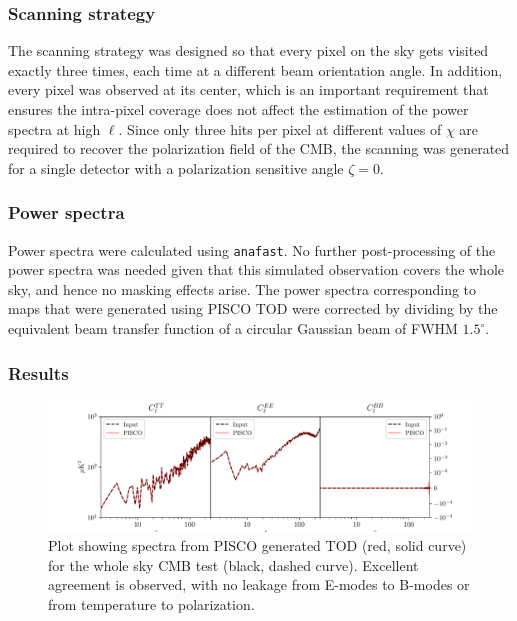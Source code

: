 \documentclass[a4paper,11pt]{article}
\begin{document}
\subsubsection{Scanning strategy}

The scanning strategy was designed so that every pixel on the sky gets visited exactly three times, each time at a different beam orientation angle. In addition, every pixel was observed at its center, which is an important requirement that ensures the intra-pixel coverage does not affect the estimation of the power spectra at high $\ell$. Since only three hits per pixel at different values of $\chi$ are required to recover the polarization field of the CMB, the scanning was generated for a single detector with a polarization sensitive angle $\zeta=0$.

\subsubsection{Power spectra}

Power spectra were calculated using \texttt{anafast}. No further post-processing of the power spectra was needed given that this simulated observation covers the whole sky, and hence no masking effects arise. The power spectra corresponding to maps that were generated using PISCO TOD were corrected by dividing by the equivalent beam transfer function of a circular Gaussian beam of FWHM $1.5^\circ$. 

\subsubsection{Results}

\begin{figure}
	\centering
	\includegraphics[width=1\linewidth]{figures/cmb_r0d00_CLASS_wholeskytest.pdf}
	\caption{Plot showing spectra from PISCO generated TOD (red, solid curve) for the whole sky CMB test (black, dashed curve). Excellent agreement is observed, with no leakage from E-modes to B-modes or from temperature to polarization. }
	\label{fig::pisco4wholesky}
\end{figure}
\end{document}
